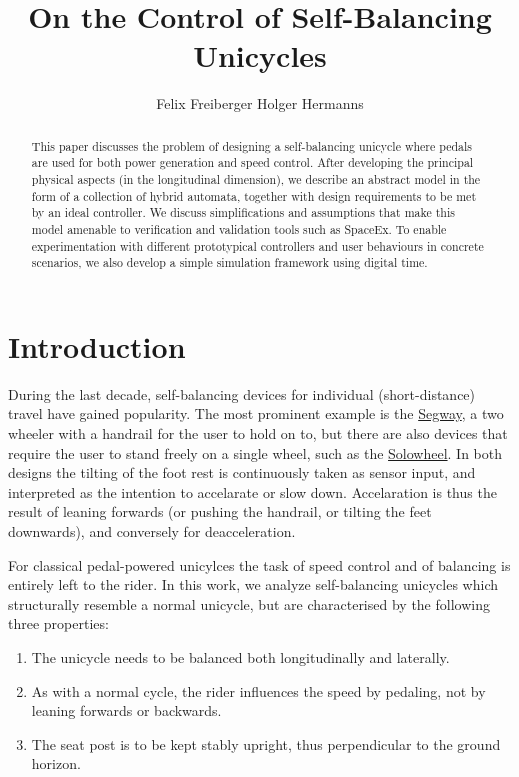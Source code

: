 \documentclass[copyright,submission]{eptcs}
\title{On the Control of Self-Balancing Unicycles}
\author{Felix Freiberger \qquad Holger Hermanns
    \institute{Saarland University -- Computer Science}
}
\begin{document}
\maketitle


\begin{abstract}
    This paper discusses the problem of designing a self-balancing unicycle where pedals are used for both power generation and speed control. After developing the principal physical aspects (in the longitudinal dimension), we describe an abstract model in the form of a collection of hybrid automata, together with design requirements to be met by an ideal controller. We discuss simplifications and assumptions that make this model amenable to verification and validation tools such as SpaceEx. To enable experimentation with different prototypical controllers and user behaviours in concrete scenarios, we also develop a simple simulation framework using digital time.
\end{abstract}


\section{Introduction}
 During the last decade, self-balancing devices for individual
 (short-distance) travel have gained popularity. The most prominent
 example is the \href{http://www.segway.com/}{Segway}, a two wheeler
 with a handrail for the user to hold on to, but there are also
 devices that require the user to stand freely on a single wheel, such
 as the \href{http://www.solowheel.eu/}{Solowheel}. In both designs
 the tilting of the foot rest is continuously taken as sensor input,
 and interpreted as the intention to accelarate or slow
 down. Accelaration is thus the result of leaning forwards (or pushing
 the handrail, or tilting the feet downwards), and conversely for
 deacceleration.

For classical pedal-powered unicylces the task of speed control and of
balancing is entirely left to the rider. In this work, we analyze
self-balancing unicycles which structurally resemble a normal
unicycle, but are characterised by the following three properties:

\begin{enumerate}
\item
    The unicycle needs to be balanced both longitudinally and laterally.
\item
    As with a normal cycle, the rider influences the speed by pedaling,
    not by leaning forwards or backwards.
\item
The seat post is to be kept stably upright, thus perpendicular to the ground horizon. 
\end{enumerate}
\end{document}
